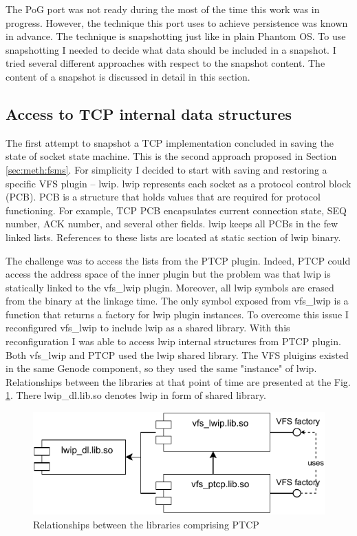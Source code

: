 The PoG port was not ready during the most of the time this work was in
progress. However, the technique this port uses to achieve persistence was
known in advance. The technique is snapshotting just like in plain Phantom OS.
To use snapshotting I needed to decide what data should be included in a
snapshot. I tried several different approaches with respect to the snapshot
content. The content of a snapshot is discussed in detail in this section.

\subsection{Access to TCP internal data structures}

The first attempt to snapshot a TCP implementation concluded in saving the
state of socket state machine. This is the second approach proposed in Section
\ref{sec:meth:fsms}. For simplicity I decided to start with saving and
restoring a specific VFS plugin -- lwip. lwip represents each socket as a
protocol control block (PCB). PCB is a structure that holds values that are
required for protocol functioning. For example, TCP PCB encapsulates current
connection state, SEQ number, ACK number, and several other fields. lwip keeps
all PCBs in the few linked lists. References to these lists are located at
static section of lwip binary.

The challenge was to access the lists from the PTCP plugin. Indeed, PTCP could
access the address space of the inner plugin but the problem was that lwip is
statically linked to the vfs\_lwip plugin. Moreover, all lwip symbols are
erased from the binary at the linkage time. The only symbol exposed from
vfs\_lwip is a function that returns a factory for lwip plugin instances. To
overcome this issue I reconfigured vfs\_lwip to include lwip as a shared
library. With this reconfiguration I was able to access lwip internal
structures from PTCP plugin. Both vfs\_lwip and PTCP used the lwip shared
library. The VFS pluigins existed in the same Genode component, so they used
the same "instance" of lwip. Relationships between the libraries at that point
of time are presented at the Fig. \ref{fig:lib_deps}. There lwip\_dl.lib.so
denotes lwip in form of shared library.

\begin{figure}
    \centering
    \includegraphics[]{figs/ptcp_libs.pdf}
    \caption{Relationships between the libraries comprising PTCP}
    \label{fig:lib_deps}
\end{figure}

